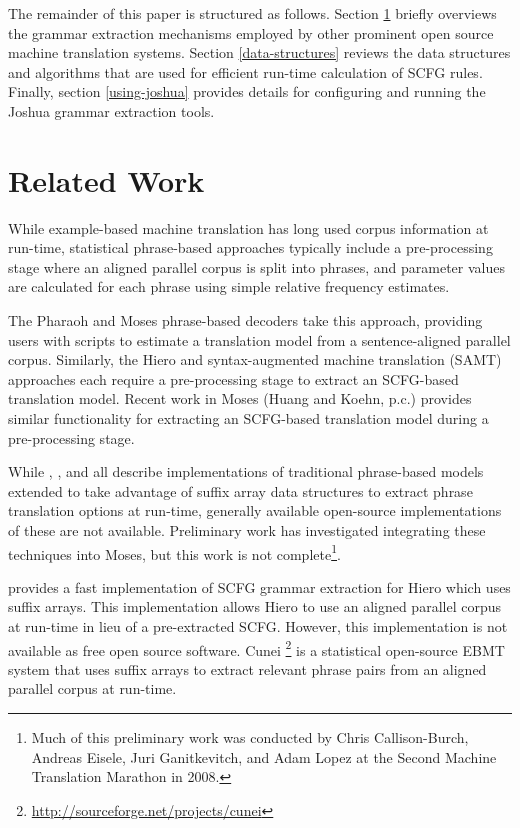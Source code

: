 \documentclass{pbml}
\newcommand{\newcite}{\namecite}
\begin{document}
The remainder of this paper is structured as follows. Section \ref{related-work} briefly overviews the grammar extraction mechanisms employed by other prominent open source machine translation systems. Section \ref{data-structures} reviews the data structures and algorithms that are used for efficient run-time calculation of SCFG rules. Finally, section \ref{using-joshua} provides details for configuring and running the Joshua grammar extraction tools.


\section{Related Work}
\label{related-work}

While example-based machine translation has long used corpus information at run-time, statistical phrase-based approaches typically include a pre-processing stage where an aligned parallel corpus is split into phrases, and parameter values are calculated for each phrase using simple relative frequency estimates.

The Pharaoh \cite{Koehn2004} and Moses \cite{Moses} phrase-based decoders take this approach, providing users with scripts to estimate a translation model from a sentence-aligned parallel corpus. Similarly, the Hiero \cite{Chiang2007} and syntax-augmented machine translation (SAMT) \cite{samt2006} approaches each require a pre-processing stage to extract an SCFG-based translation model. Recent work in Moses (Huang and Koehn, p.c.) provides similar functionality for extracting an SCFG-based translation model during a pre-processing stage.

While \newcite{Callison-Burch2005b}, \newcite{Zhang2005}, and \newcite{Lopez2008} all describe implementations of traditional phrase-based models extended to take advantage of suffix array data structures to extract phrase translation options at run-time, generally available open-source implementations of these are not available. Preliminary work has investigated integrating these techniques into Moses, but this work is not complete\footnote{Much of this preliminary work was conducted by Chris Callison-Burch, Andreas Eisele, Juri Ganitkevitch, and Adam Lopez at the Second Machine Translation Marathon in 2008.}. 

\newcite{Lopez2008} provides a fast implementation of SCFG grammar extraction for Hiero which uses suffix arrays. This implementation allows Hiero to use an aligned parallel corpus at run-time in lieu of a pre-extracted SCFG. However, this implementation is not available as free open source software. Cunei \cite{Phillips2009}\footnote{\url{http://sourceforge.net/projects/cunei}} is a statistical open-source EBMT system that uses suffix arrays to extract relevant phrase pairs from an aligned parallel corpus at run-time. 
\end{document}
